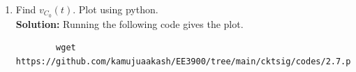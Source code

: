 \documentclass[journal,12pt,twocolumn]{IEEEtran}
\newcommand{\solution}{\noindent \textbf{Solution: }}
\providecommand{\brak}[1]{\ensuremath{\left(#1\right)}}
\providecommand{\system}[1]{\overset{\mathcal{#1}}{ \longleftrightarrow}}
\numberwithin{equation}{section}
\renewcommand\thesection{\arabic{section}}
\begin{document}
\begin{enumerate}[label=\arabic*.,ref=\thesection.\theenumi]
\begin{figure}[!ht]
			\caption{}
			\label{fig:lap-ckt}
\end{figure}
		where 
		\begin{align}
			u(t) \system{L} V_1(s)
			\\
			2u(t) \system{L} V_2(s)
		\end{align}
		Find the voltage across the capacitor $V_{C_0}(s)$.\\
		\solution
		\begin{align}
		R_{eff}=\frac{1}{1+\frac{1}{2}}
		=\frac{2}{3} \Omega\\
		V_{eff}=\frac{1}{1+\frac{1}{2}}
		=\frac{2}{3}V
		\end{align}
\begin{align}
V_{C_0}(s)&=V_{S}(s)\frac{C_{0}}{C_{0}+R_{eff}}\\
&=\brak{\frac{4}{3s}}\brak{\frac{\frac{1}{s}}{\frac{1}{s}+\frac{2}{3}}}\\
\label{eq:laptr}
&=\frac{3+4s}{3s\brak{s+\frac{3}{2}}}
\end{align}
	\item Find $v_{C_0}(t)$.  Plot using python.\\
	\solution Running the following code gives the plot.
	\begin{lstlisting}
		wget https://github.com/kamujuaakash/EE3900/tree/main/cktsig/codes/2.7.py
	\end{lstlisting}
	

\end{enumerate}
\end{document}
